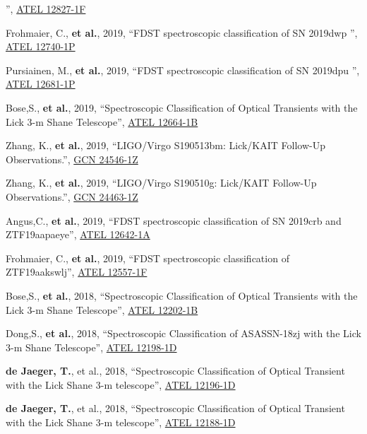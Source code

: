 \documentclass[12pt]{article}
\begin{document}
\begin{bibenum}
'', \href{https://ui.adsabs.harvard.edu/abs/2019ATel12827....1F/abstract}{ATEL 12827-1F}
	\item Frohmaier, C., \textbf{et al.}, 2019, ``FDST spectroscopic classification of SN 2019dwp
'', \href{https://ui.adsabs.harvard.edu/abs/2019ATel12740....1F/abstract}{ATEL 12740-1P}
	\item Pursiainen, M., \textbf{et al.}, 2019, ``FDST spectroscopic classification of SN 2019dpu
'', \href{https://ui.adsabs.harvard.edu/abs/2019ATel12740....1F/abstract}{ATEL 12681-1P}
	\item Bose,S., \textbf{et al.}, 2019, ``Spectroscopic Classification of Optical Transients with the Lick 3-m Shane Telescope'', \href{https://ui.adsabs.harvard.edu/abs/2019ATel12664....1B/abstract}{ATEL 12664-1B}
	\item Zhang, K., \textbf{et al.}, 2019, ``LIGO/Virgo S190513bm: Lick/KAIT Follow-Up Observations.'', \href{https://ui.adsabs.harvard.edu/abs/2019GCN.24546....1Z/abstract}{GCN 24546-1Z}
	\item Zhang, K., \textbf{et al.}, 2019, ``LIGO/Virgo S190510g: Lick/KAIT Follow-Up Observations.'', \href{https://ui.adsabs.harvard.edu/abs/2019GCN.24463....1Z/abstract}{GCN 24463-1Z}
	\item Angus,C., \textbf{et al.}, 2019, ``FDST spectroscopic classification of SN 2019crb and ZTF19aapaeye'', \href{https://ui.adsabs.harvard.edu/abs/2019ATel12642....1A/abstract}{ATEL 12642-1A}
	\item Frohmaier, C., \textbf{et al.}, 2019, ``FDST spectroscopic classification of ZTF19aakswlj'', \href{https://ui.adsabs.harvard.edu/abs/2019ATel12557....1F/abstract}{ATEL 12557-1F}
	\item Bose,S., \textbf{et al.}, 2018, ``Spectroscopic Classification of Optical Transients with the Lick 3-m Shane Telescope'', \href{https://ui.adsabs.harvard.edu/abs/2018ATel12202....1B/abstract}{ATEL 12202-1B}
	\item Dong,S., \textbf{et al.}, 2018, ``Spectroscopic Classification of ASASSN-18zj with the Lick 3-m Shane Telescope'', \href{https://ui.adsabs.harvard.edu/abs/2018ATel12198....1D/abstract}{ATEL 12198-1D}
    \item \textbf{de Jaeger, T.}, et al., 2018, ``Spectroscopic Classification of Optical Transient with the Lick Shane 3-m telescope'', \href{http://adsabs.harvard.edu/abs/2018ATel.12196....1D}{ATEL 12196-1D}
    \item \textbf{de Jaeger, T.}, et al., 2018, ``Spectroscopic Classification of Optical Transient with the Lick Shane 3-m telescope'', \href{http://adsabs.harvard.edu/abs/2018ATel.12188....1D}{ATEL 12188-1D}

\end{bibenum}
\end{document}
